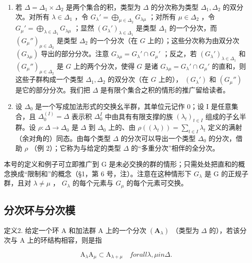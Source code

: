 \begin{enumerate}
\def\labelenumi{(\arabic{enumi})}
\setcounter{enumi}{2}
\item
  若 \(\Delta = \Delta_1 \times \Delta_2\) 是两个集合的积，类型为 \(\Delta\) 的分次称为类型 \(\Delta_1, \Delta_2\) 的双分次。对所有 \(\lambda \in \Delta_1\) ，令 \(G_{\lambda}' = \bigoplus_{\mu \in \Delta_2} G_{\lambda\mu}\) ；对所有 \(\mu \in \Delta_2\) ，令 \(G_{\mu}' = \bigoplus_{\lambda \in \Delta_1} G_{\lambda\mu}\) ；显然 \((G_{\lambda}')_{\lambda \in \Delta_1}\) 是类型 \(\Delta_1\) 的一个分次，而 \((G_{\mu}'')_{\mu \in \Delta_2}\) 是类型 \(\Delta_2\) 的一个分次（在 \(G\) 上的）；这些分次称为由双分次 \((G_{\lambda\mu})\) 导出的部分分次。注意 \(G_{\lambda\mu} = G_{\lambda}' \cap G_{\mu}'\) ；反之，若 \((G_{\lambda}')_{\lambda \in \Delta_1}\) 和 \((G_{\mu}'')_{\mu \in \Delta_2}\) 是 \(G\) 上的两个分次，使得 \(G\) 是诸 \(G_{\lambda\mu} = G_{\lambda}' \cap G_{\mu}'\) 的直和，则这些子群构成一个类型 \(\Delta_1, \Delta_2\) 的双分次（在 \(G\) 上的）， \((G_{\lambda}')\) 和 \((G_{\mu}'')\) 是它的部分分次。我们把 \(\Delta\) 是有限个集合之积的情形的推广留给读者。
\item
  设 \(\Delta_0\) 是一个写成加法形式的交换幺半群，其单位元记作 0；设 I 是任意集合，且 \(\Delta_0^{(I)} = \Delta\) 表示积 \(\Delta_0^I\) 中由具有有限支撑的族 \((\lambda_t)_{t \in I}\) 组成的子幺半群。设 \(\rho: \Delta \to \Delta_0\) 是 \(\Delta\) 到 \(\Delta_0\) 上的、由 \(\rho((\lambda_t)) = \sum_{t \in I} \lambda_t\) 定义的满射（余对角的）同态。由每个类型 \(\Delta\) 的分次可以导出一个类型 \(\Delta_0\) 的分次，借助 \(\rho\) （例 2）；它称为与给定的类型 \(\Delta\) 的“多重分次”相伴的全分次。
\end{enumerate}

本号的定义和例子可立即推广到 G 是未必交换的群的情形；只需处处把直和的概念换成“限制和”的概念（§1，第 6 号，注）。注意在这种情形下 \(G_{\lambda}\) 是 G 的正规子群，且对 \(\lambda \neq \mu\) ， \(G_{\lambda}\) 的每个元素与 \(G_{\mu}\) 的每个元素可交换。

\subsection{分次环与分次模}

定义2. 给定一个环 A 和加法群 A 上的一个分次 \((\mathbf{A}_{\lambda})\) （类型为 \(\Delta\) 的），若该分次与 A 上的环结构相容，则是指

\[
\mathrm{A} _ {\lambda} \mathrm{A} _ {\mu} \subset \mathrm{A} _ {\lambda + \mu} \quad f o r a l l \lambda , \mu i n \Delta .\tag{1}
\]

